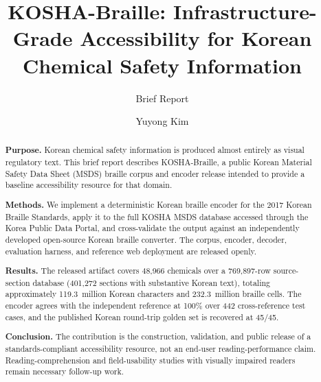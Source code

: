 \documentclass[smallextended]{svjour3}
\begin{document}
\title{KOSHA-Braille: Infrastructure-Grade Accessibility for Korean Chemical Safety Information}
\subtitle{Brief Report}


\author{Yuyong Kim}



\date{}

\maketitle

\begin{abstract}
\textbf{Purpose.} Korean chemical safety information is produced almost entirely as visual regulatory text. This brief report describes KOSHA-Braille, a public Korean Material Safety Data Sheet (MSDS) braille corpus and encoder release intended to provide a baseline accessibility resource for that domain.

\textbf{Methods.} We implement a deterministic Korean braille encoder for the 2017 Korean Braille Standards, apply it to the full KOSHA MSDS database accessed through the Korea Public Data Portal, and cross-validate the output against an independently developed open-source Korean braille converter. The corpus, encoder, decoder, evaluation harness, and reference web deployment are released openly.

\textbf{Results.} The released artifact covers 48{,}966 chemicals over a 769{,}897-row source-section database (401{,}272 sections with substantive Korean text), totaling approximately 119.3~million Korean characters and 232.3~million braille cells. The encoder agrees with the independent reference at 100\% over 442 cross-reference test cases, and the published Korean round-trip golden set is recovered at 45/45.

\textbf{Conclusion.} The contribution is the construction, validation, and public release of a standards-compliant accessibility resource, not an end-user reading-performance claim. Reading-comprehension and field-usability studies with visually impaired readers remain necessary follow-up work.
\end{abstract}
\end{document}
